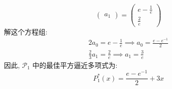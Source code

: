 \documentclass[lang = zh]{iwork}
\begin{document}
\begin{sol}
\begin{equation*}
\begin{pmatrix}
      a_1
    \end{pmatrix}
    =
    \begin{pmatrix}
      e - \frac{1}{e} \\
      \frac{2}{e}
    \end{pmatrix}
  \end{equation*}
  解这个方程组:
  \begin{gather*}
    2a_0 = e - \frac{1}{e} \implies a_0 = \frac{e - e^{-1}}{2} \\
    \frac{2}{3}a_1 = \frac{2}{e} \implies a_1 = \frac{3}{e}
  \end{gather*}
  因此, $\mathscr{P}_1$ 中的最佳平方逼近多项式为:
  \begin{equation*}
    P_1^*(x) = \frac{e - e^{-1}}{2} + 3x
  \end{equation*}


\end{sol}
\end{document}
